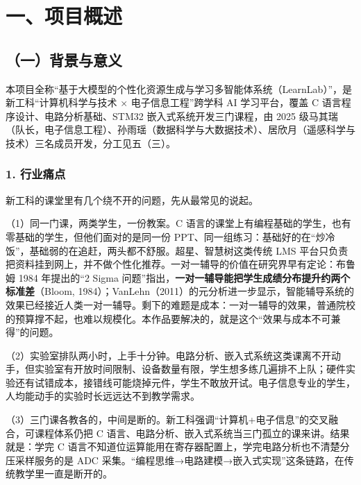 \documentclass[zihao=-4,a4paper,UTF8,fontset=windows]{ctexart}
\begin{document}
\section{一、项目概述}
\subsection{（一）背景与意义}


本项目全称“基于大模型的个性化资源生成与学习多智能体系统（LearnLab）”，是新工科“计算机科学与技术 × 电子信息工程”跨学科 AI 学习平台，覆盖 C 语言程序设计、电路分析基础、STM32 嵌入式系统开发三门课程，由 2025 级马其瑞（队长，电子信息工程）、孙雨瑶（数据科学与大数据技术）、居欣月（遥感科学与技术）三名成员开发，分工见五（三）。

\subsubsection{1. 行业痛点}


新工科的课堂里有几个绕不开的问题，先从最常见的说起。



（1）同一门课，两类学生，一份教案。C 语言的课堂上有编程基础的学生，也有零基础的学生，但他们面对的是同一份 PPT、同一组练习：基础好的在“炒冷饭”，基础弱的在追赶，两头都不舒服。超星、智慧树这类传统 LMS 平台只负责把资料挂到网上，并不做个性化推荐。一对一辅导的价值在研究界早有定论：布鲁姆 1984 年提出的“2 Sigma 问题”指出，\textbf{一对一辅导能把学生成绩分布提升约两个标准差}（Bloom, 1984）；VanLehn（2011）的元分析进一步显示，智能辅导系统的效果已经接近人类一对一辅导。剩下的难题是成本：一对一辅导的效果，普通院校的预算撑不起，也难以规模化。本作品要解决的，就是这个“效果与成本不可兼得”的问题。



（2）实验室排队两小时，上手十分钟。电路分析、嵌入式系统这类课离不开动手，但实验室有开放时间限制、设备数量有限，学生想多练几遍排不上队；硬件实验还有试错成本，接错线可能烧掉元件，学生不敢放开试。电子信息专业的学生，人均能动手的实验时长远远达不到教学需求。



（3）三门课各教各的，中间是断的。新工科强调“计算机+电子信息”的交叉融合，可课程体系仍把 C 语言、电路分析、嵌入式系统当三门孤立的课来讲。结果就是：学完 C 语言不知道位运算能用在寄存器配置上，学完电路分析也不清楚分压采样服务的是 ADC 采集。“编程思维→电路建模→嵌入式实现”这条链路，在传统教学里一直是断开的。
\end{document}
